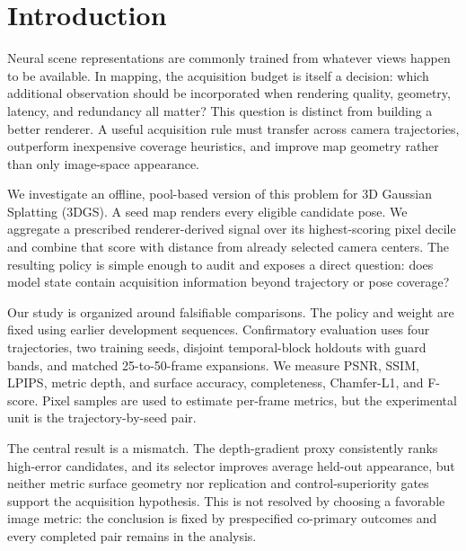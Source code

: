 \section{Introduction}

Neural scene representations are commonly trained from whatever views happen
to be available.  In mapping, the acquisition budget is itself a decision:
which additional observation should be incorporated when rendering quality,
geometry, latency, and redundancy all matter?  This question is distinct from
building a better renderer.  A useful acquisition rule must transfer across
camera trajectories, outperform inexpensive coverage heuristics, and improve
map geometry rather than only image-space appearance.

We investigate an offline, pool-based version of this problem for 3D Gaussian
Splatting (3DGS).  A seed map renders every eligible candidate pose.  We
aggregate a prescribed renderer-derived signal over its highest-scoring pixel
decile and combine that score with distance from already selected camera
centers.  The resulting policy is simple enough to audit and exposes a direct
question: does model state contain acquisition information beyond trajectory or
pose coverage?

Our study is organized around falsifiable comparisons.  The policy and weight
are fixed using earlier development sequences.  Confirmatory evaluation uses
four trajectories, two training seeds, disjoint temporal-block
holdouts with guard bands, and matched 25-to-50-frame expansions.  We measure
PSNR, SSIM, LPIPS, metric depth, and surface accuracy, completeness, Chamfer-L1,
and F-score.  Pixel samples are used to estimate per-frame metrics, but the
experimental unit is the trajectory-by-seed pair.

The central result is a mismatch.  The depth-gradient proxy consistently ranks
high-error candidates, and its selector improves average held-out appearance,
but neither metric surface geometry nor replication and control-superiority
gates support the acquisition hypothesis.  This is not resolved by choosing a
favorable image metric: the conclusion is fixed by prespecified co-primary
outcomes and every completed pair remains in the analysis.

